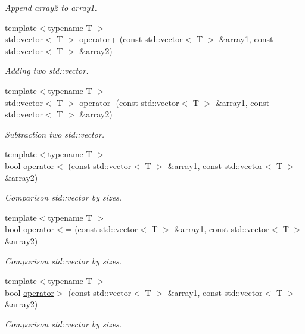 \begin{DoxyCompactItemize}
\begin{DoxyCompactList}\small\item\em Append array2 to array1. \end{DoxyCompactList}\item 
{\footnotesize template$<$typename T $>$ }\\std\+::vector$<$ T $>$ \mbox{\hyperlink{namespaceofo_acbaf18732443a853d482cebefb9f6e98}{operator+}} (const std\+::vector$<$ T $>$ \&array1, const std\+::vector$<$ T $>$ \&array2)
\begin{DoxyCompactList}\small\item\em Adding two std\+::vector. \end{DoxyCompactList}\item 
{\footnotesize template$<$typename T $>$ }\\std\+::vector$<$ T $>$ \mbox{\hyperlink{namespaceofo_acb123ddb76ace937baf29a4b6f2fcd8a}{operator-\/}} (const std\+::vector$<$ T $>$ \&array1, const std\+::vector$<$ T $>$ \&array2)
\begin{DoxyCompactList}\small\item\em Subtraction two std\+::vector. \end{DoxyCompactList}\item 
{\footnotesize template$<$typename T $>$ }\\bool \mbox{\hyperlink{namespaceofo_a3a9f0e591617562dc29964c77510abf1}{operator$<$}} (const std\+::vector$<$ T $>$ \&array1, const std\+::vector$<$ T $>$ \&array2)
\begin{DoxyCompactList}\small\item\em Comparison std\+::vector by sizes. \end{DoxyCompactList}\item 
{\footnotesize template$<$typename T $>$ }\\bool \mbox{\hyperlink{namespaceofo_a248e627fce31919f3453b83efddaf1ab}{operator$<$=}} (const std\+::vector$<$ T $>$ \&array1, const std\+::vector$<$ T $>$ \&array2)
\begin{DoxyCompactList}\small\item\em Comparison std\+::vector by sizes. \end{DoxyCompactList}\item 
{\footnotesize template$<$typename T $>$ }\\bool \mbox{\hyperlink{namespaceofo_a5721f395418c99bbb91789f73f6fe7e4}{operator$>$}} (const std\+::vector$<$ T $>$ \&array1, const std\+::vector$<$ T $>$ \&array2)
\begin{DoxyCompactList}\small\item\em Comparison std\+::vector by sizes. \end{DoxyCompactList}\item 

\end{DoxyCompactItemize}
